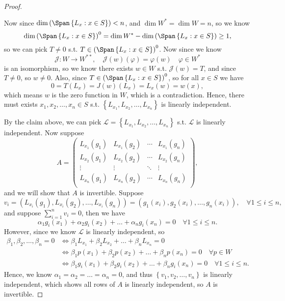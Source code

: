\begin{proof}
\begin{explanation}
        Now since \(\dim \left( \Span \left\{ L_x: x \in S \right\}  \right) < n \), and \(\dim W^* = \dim W = n\), so we know 
        \[
            \dim \left( \Span \left\{ L_x : x \in S \right\}  \right)^0 = \dim W^* - \dim \left( \Span \left\{ L_x: x \in S \right\}  \right) \ge 1, 
        \] so we can pick \(T \neq 0\) s.t. \(T \in \left( \Span \left\{ L_x: x \in S \right\}  \right)^0 \). Now since we know 
        \[
            \mathcal{J} : W \to W^{* *}, \quad \mathcal{J} (w) (\varphi ) = \varphi (w) \quad \varphi \in W^*
        \] is an isomorphism, so we know there exists \(w \in W\) s.t. \(\mathcal{J} (w) = T\), and since \(T \neq 0\), so \(w \neq 0\). Also, since \(T \in \left( \Span \left\{ L_x : x \in S \right\}  \right)^0 \), so for all \(x \in S\) we have 
        \[
            0 = T(L_x) = J(w) (L_x) = L_x(w) = w(x),
        \] which means \(w\) is the zero function in \(W\), which is a contradiction. Hence, there must exists \(x_1, x_2, \dots , x_n \in S\) s.t. \(\left\{ L_{x_1}, L_{x_2}, \dots , L_{x_n} \right\} \) is linearly independent. 
    \end{explanation} 
    By the claim above, we can pick \(\mathcal{L} = \left\{ L_{x_1}, L_{x_2}, \dots , L_{x_n} \right\} \) s.t. \(\mathcal{L} \) is linearly independent. Now suppose 
    \[
        A = \begin{pmatrix}
            L_{x_1}(g_1) & L_{x_1}(g_2) &  \cdots & L_{x_1}(g_n)  \\
            L_{x_2}(g_1) & L_{x_2}(g_2) & \cdots & L_{x_2}(g_n)  \\
            \vdots & \vdots & \ddots & \vdots  \\
            L_{x_n}(g_1) & L_{x_n}(g_2) & \cdots & L_{x_n}(g_n)  \\
        \end{pmatrix},
    \] and we will show that \(A\) is invertible. Suppose 
    \[
        v_i = \left( L_{x_i}(g_1), L_{x_i}(g_2), \dots , L_{x_i}(g_n) \right) = \left( g_1(x_i), g_2(x_i), \dots, g_n(x_i)  \right),  \quad \forall 1 \le i \le n, 
    \] and suppose \(\sum_{i=1}^n v_i = 0 \), then we have 
    \[
        \alpha _1 g_i(x_1) + \alpha _2 g_i (x_2) + \dots + \alpha _n g_i(x_n) = 0 \quad \forall 1 \le i \le n.
    \] 
    However, since we know \(\mathcal{L} \) is linearly independent, so 
    \begin{align*}
        \beta _1, \beta _2, \dots , \beta _n = 0 &\iff \beta _1 L_{x_1} + \beta _2 L_{x_2} + \dots + \beta _n L_{x_n} = 0 \\
        &\iff \beta _1 p(x_1) + \beta _2 p(x_2) + \dots + \beta _n p(x_n) = 0 \quad \forall p \in W \\
        &\iff \beta _1 g_i(x_1) + \beta _2 g_i(x_2) + \dots + \beta _n g_i(x_n) = 0 \quad \forall 1 \le i \le n.
    \end{align*} 
    Hence, we know \(\alpha _1 = \alpha _2 = \dots = \alpha _n = 0\), and thus \(\left\{ v_1, v_2, \dots , v_n \right\} \) is linearly independent, which shows all rows of \(A\) is linearly independent, so \(A\) is invertible.
    

\end{proof}
